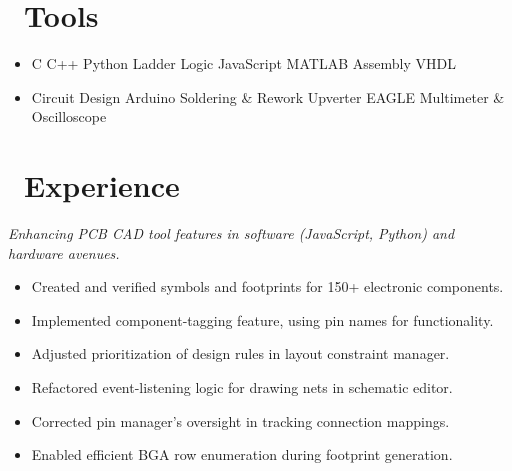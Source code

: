 \documentclass{resume}
\begin{document}



\section{\faWrench\ Tools}

\begin{itemize}[parsep=0.5ex]
  \item %
  C\textperiodcentered 
  C++\textperiodcentered
  Python\textperiodcentered
  Ladder Logic\textperiodcentered
  JavaScript\textperiodcentered
  MATLAB\textperiodcentered
  Assembly\textperiodcentered
  VHDL
  \item %
  Circuit Design\textperiodcentered
  Arduino\textperiodcentered
  Soldering \& Rework\textperiodcentered
  Upverter\textperiodcentered
  EAGLE\textperiodcentered
  Multimeter \& Oscilloscope
\end{itemize}

\section{\faLineChart\ Experience}

\textit{Enhancing PCB CAD tool features in software (JavaScript, Python) and hardware avenues.}
\begin{itemize}
  \item Created and verified symbols and footprints for 150+ electronic components.
  \item Implemented component-tagging feature, using pin names for functionality.
  \item Adjusted prioritization of design rules in layout constraint manager.
  \item Refactored event-listening logic for drawing nets in schematic editor.
  \item Corrected pin manager's oversight in tracking connection mappings.
  \item Enabled efficient BGA row enumeration during footprint generation.
\end{itemize}
\end{document}
